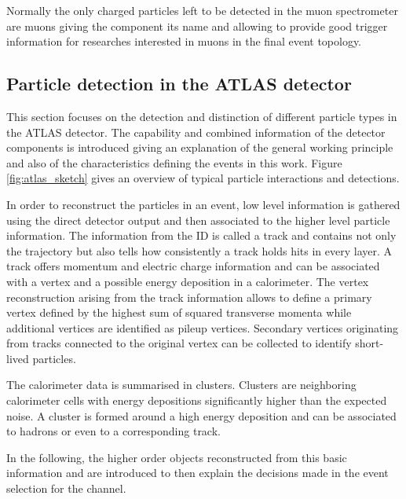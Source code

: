 Normally the only charged particles left to be detected in the muon spectrometer are muons giving the component its name and allowing to provide good trigger information for researches interested in muons in the final event topology.





\subsection{Particle detection in the ATLAS detector}

This section focuses on the detection and distinction of different particle types in the ATLAS detector. The capability and combined information of the detector components is introduced giving an explanation of the general working principle and also of the characteristics defining the events in this work. Figure \ref{fig:atlas_sketch} gives an overview of typical particle interactions and detections.

In order to reconstruct the particles in an event, low level information is gathered using the direct detector output and then associated to the higher level particle information.
The information from the ID is called a track and contains not only the trajectory but also tells how consistently a track holds hits in every layer. A track offers momentum and electric charge information and can be associated with a vertex and a possible energy deposition in a calorimeter. 
The vertex reconstruction arising from the track information allows to define a primary vertex defined by the highest sum of squared transverse momenta while additional vertices are identified as pileup vertices.
Secondary vertices originating from tracks connected to the original vertex can be collected to identify short-lived particles.

The calorimeter data is summarised in clusters. Clusters are neighboring calorimeter cells with energy depositions significantly higher than the expected noise. A cluster is formed around a high energy deposition and can be associated to hadrons or even to a corresponding track.

In the following, the higher order objects reconstructed from this basic information and are introduced to then explain the decisions made in the event selection for the \tW channel.

